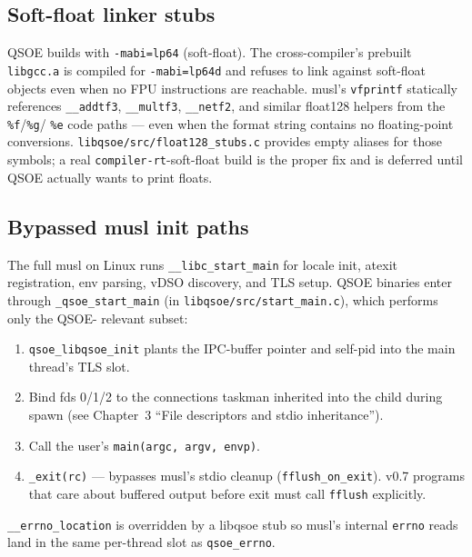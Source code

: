 \subsection{Soft-float linker stubs}

QSOE builds with \texttt{-mabi=lp64} (soft-float).  The cross-compiler's
prebuilt \texttt{libgcc.a} is compiled for \texttt{-mabi=lp64d} and
refuses to link against soft-float objects even when no FPU
instructions are reachable.  musl's \texttt{vfprintf} statically
references \texttt{\_\_addtf3}, \texttt{\_\_multf3}, \texttt{\_\_netf2},
and similar float128 helpers from the \texttt{\%f}/\texttt{\%g}/
\texttt{\%e} code paths --- even when the format string contains no
floating-point conversions.  \texttt{libqsoe/src/float128\_stubs.c}
provides empty aliases for those symbols; a real
\texttt{compiler-rt}-soft-float build is the proper fix and is
deferred until QSOE actually wants to print floats.

\subsection{Bypassed musl init paths}

The full musl on Linux runs \texttt{\_\_libc\_start\_main} for locale
init, atexit registration, env parsing, vDSO discovery, and TLS setup.
QSOE binaries enter through \texttt{\_qsoe\_start\_main} (in
\texttt{libqsoe/src/start\_main.c}), which performs only the QSOE-
relevant subset:

\begin{enumerate}
    \item \texttt{qsoe\_libqsoe\_init} plants the IPC-buffer pointer
          and self-pid into the main thread's TLS slot.
    \item Bind fds 0/1/2 to the connections taskman inherited into the
          child during spawn (see Chapter~3 ``File descriptors and
          stdio inheritance'').
    \item Call the user's \texttt{main(argc, argv, envp)}.
    \item \texttt{\_exit(rc)} --- bypasses musl's stdio cleanup
          (\texttt{fflush\_on\_exit}).  v0.7 programs that care about
          buffered output before exit must call \texttt{fflush}
          explicitly.
\end{enumerate}

\texttt{\_\_errno\_location} is overridden by a libqsoe stub so musl's
internal \texttt{errno} reads land in the same per-thread slot as
\texttt{qsoe\_errno}.

